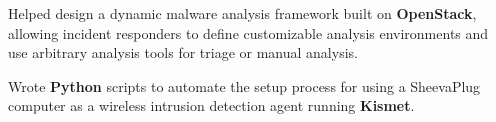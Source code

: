 


\begin{rExperience}

  \item Helped design a dynamic malware analysis framework built on \textbf{OpenStack}, allowing incident responders to
    define customizable analysis environments and use arbitrary analysis tools for triage or manual analysis.

  \item Wrote \textbf{Python} scripts to automate the setup process for using a SheevaPlug computer as a wireless intrusion detection agent running \textbf{Kismet}.

\end{rExperience}
